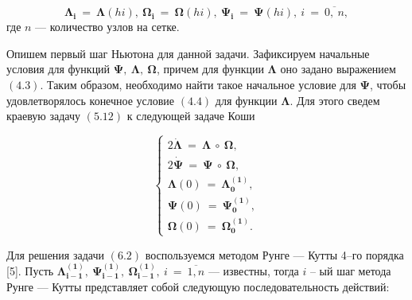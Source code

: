 \documentclass[14pt]{extreport}
\begin{document}
\begin{equation}
\boldsymbol{\Lambda_i}\ =\ \boldsymbol{\Lambda}(hi),\ \boldsymbol{\Omega_i}\ =\ \boldsymbol\Omega(hi),\ \boldsymbol{\Psi_i}\
=\ \boldsymbol\Psi(hi),\ i\ =\ \overline{0,\ n},
\end{equation}
где $n$ --- количество узлов на сетке.

Опишем первый шаг Ньютона для данной задачи. Зафиксируем начальные условия для функций $\boldsymbol\Psi,\ \boldsymbol\Lambda,\ \boldsymbol\Omega$,
причем для функции $\boldsymbol\Lambda$
оно задано выражением $(4.3)$. Таким образом, необходимо найти такое начальное условие для $\boldsymbol\Psi$, чтобы удовлетворялось конечное условие $(4.4)$
для функции $\boldsymbol\Lambda$. Для этого сведем краевую задачу $(5.12)$ к следующей задаче Коши

\begin{equation}
\begin{cases}
2\boldsymbol{\dot{\Lambda}}\ =\ \boldsymbol\Lambda\ \circ\ \boldsymbol\Omega, \\
2\boldsymbol{\dot{\Psi}}\ =\ \boldsymbol\Psi\ \circ\ \boldsymbol\Omega,\\
\boldsymbol\Lambda(0)\ =\ \boldsymbol{\Lambda_0^{(1)}},\\
\boldsymbol\Psi(0)\ =\ \boldsymbol{\Psi_0^{(1)}},\\
\boldsymbol\Omega(0)\ =\ \boldsymbol{\Omega_0^{(1)}}.
 \end{cases}
\end{equation}

Для решения задачи $(6.2)$ воспользуемся методом Рунге --- Кутты 4--го порядка [5]. Пусть $\boldsymbol{\Lambda_{i - 1}^{(1)}},\
\boldsymbol{\Psi_{i - 1}^{(1)}},\ 
\boldsymbol{\Omega_{i - 1}^{(1)}},\ i\ =\ \overline{1, n}$ --- известны, тогда $i$ -- ый шаг метода Рунге --- Кутты представляет собой
следующую последовательность действий:
\end{document}

